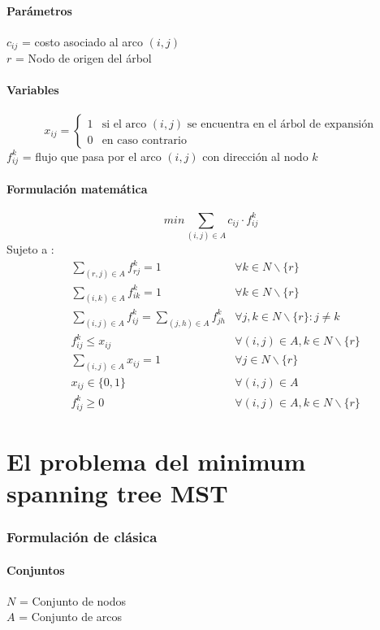 \documentclass{article}
\numberwithin{equation}{section}
\begin{document}
\subsection{Parámetros}
$c_{ij}$ = costo asociado al arco $(i,j)$\\
$r$ = Nodo de origen del árbol
\subsection{Variables}
\begin{center}
\[x_{ij}={\begin{cases}1&{\mbox{si el arco $(i,j)$ se encuentra en el árbol de expansión}}\\0&{\mbox{en caso contrario}}\end{cases}}
\]
$f_{ij}^k$ = flujo que pasa por el arco $(i,j)$ con dirección al nodo $k$
\end{center}
\subsection{Formulación matemática}
\begin{equation}
min \sum_{(i,j) \in A} c_{ij} \cdot f_{ij}^k
\end{equation}
Sujeto a : \begin{align}
& \sum_{(r,j) \in A} f_{rj}^k = 1 &\forall k \in N \backslash \{r\}\\
& \sum_{(i,k) \in A} f_{ik}^k = 1 &\forall k \in N \backslash \{r\}\\
& \sum_{(i,j) \in A} f_{ij}^k = \sum_{(j,h) \in A} f_{jh}^k &\forall j,k \in N \backslash \{r\} : j \neq k \\
& f_{ij}^k \leq x_{ij} &\forall (i,j) \in A, k \in N \backslash \{r\}\\
& \sum_{(i,j) \in A} x_{ij} = 1 &\forall j \in N \backslash \{r\}\\
& x_{ij} \in \{0,1\} &\forall (i,j) \in A\\
& f_{ij}^k \geq 0 &\forall (i,j) \in A, k \in N \backslash \{r\}
\end{align}

\newpage
\part{El problema del minimum spanning tree MST}
\section{Formulación de clásica}
\subsection{Conjuntos}
$N$ = Conjunto de nodos\\
$A$ = Conjunto de arcos
\end{document}
